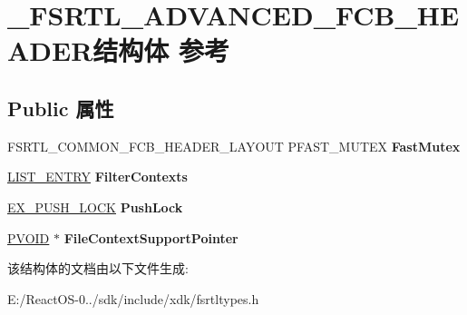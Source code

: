 \hypertarget{struct___f_s_r_t_l___a_d_v_a_n_c_e_d___f_c_b___h_e_a_d_e_r}{}\section{\+\_\+\+F\+S\+R\+T\+L\+\_\+\+A\+D\+V\+A\+N\+C\+E\+D\+\_\+\+F\+C\+B\+\_\+\+H\+E\+A\+D\+E\+R结构体 参考}
\label{struct___f_s_r_t_l___a_d_v_a_n_c_e_d___f_c_b___h_e_a_d_e_r}
\subsection*{Public 属性}
\begin{DoxyCompactItemize}
\item 
\mbox{\label{struct___f_s_r_t_l___a_d_v_a_n_c_e_d___f_c_b___h_e_a_d_e_r_a20887b7af8e34dd5f3d2fb44f65f163f}} 
F\+S\+R\+T\+L\+\_\+\+C\+O\+M\+M\+O\+N\+\_\+\+F\+C\+B\+\_\+\+H\+E\+A\+D\+E\+R\+\_\+\+L\+A\+Y\+O\+UT P\+F\+A\+S\+T\+\_\+\+M\+U\+T\+EX {\bfseries Fast\+Mutex}
\item 
\mbox{\label{struct___f_s_r_t_l___a_d_v_a_n_c_e_d___f_c_b___h_e_a_d_e_r_a1ce8f12d8ef4bd4ad146c4cc7f7d9769}} 
\hyperlink{struct___l_i_s_t___e_n_t_r_y}{L\+I\+S\+T\+\_\+\+E\+N\+T\+RY} {\bfseries Filter\+Contexts}
\item 
\mbox{\label{struct___f_s_r_t_l___a_d_v_a_n_c_e_d___f_c_b___h_e_a_d_e_r_a4d6caf9e2d3cadd9f3dccf6b08d3fe1c}} 
\hyperlink{struct___e_x___p_u_s_h___l_o_c_k}{E\+X\+\_\+\+P\+U\+S\+H\+\_\+\+L\+O\+CK} {\bfseries Push\+Lock}
\item 
\mbox{\label{struct___f_s_r_t_l___a_d_v_a_n_c_e_d___f_c_b___h_e_a_d_e_r_a5eda3377988f9fb55b5affd2b54cf00c}} 
\hyperlink{interfacevoid}{P\+V\+O\+ID} $\ast$ {\bfseries File\+Context\+Support\+Pointer}
\end{DoxyCompactItemize}


该结构体的文档由以下文件生成\+:\begin{DoxyCompactItemize}
\item 
E\+:/\+React\+O\+S-\/0../sdk/include/xdk/fsrtltypes.\+h\end{DoxyCompactItemize}
